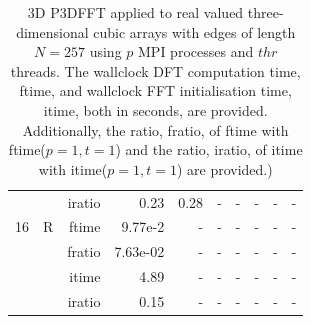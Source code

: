 \documentclass[a4paper]{article}
\begin{document}
\begin{table}[htbp]
\begin{center}
\begin{small}
\begin{tabular}{|r|r|r|r|r|r|r|r|r|r|}
             &             &  iratio &    0.23 &    0.28 &      - &      - &      - &      - &      - \\
   16 &  R &   ftime &   9.77e-2 &      - &      - &      - &      - &      - &      - \\\hline
             &             &  fratio &    7.63e-02 &     - &      - &      - &      - &      - &      - \\
             &             &  itime &    4.89  &      - &      - &      - &      - &      - &      - \\
             &             &  iratio &    0.15 &      - &      - &      - &      - &      - &      - \\\hline

\end{tabular}
\caption{3D P3DFFT applied to real valued three-dimensional cubic arrays with edges of length $N=257$ using $p$ MPI processes and $thr$ threads. The wallclock DFT computation time, ftime, and wallclock FFT initialisation time, itime, both in seconds, are provided. Additionally, the ratio, fratio, of ftime  with ftime($p=1,t=1$) and the ratio, iratio, of itime  with itime($p=1,t=1$) are provided.) }\label{Tbl:P3DFFT3d257}
\end{small}
\end{center}
\end{table}
\end{document}
